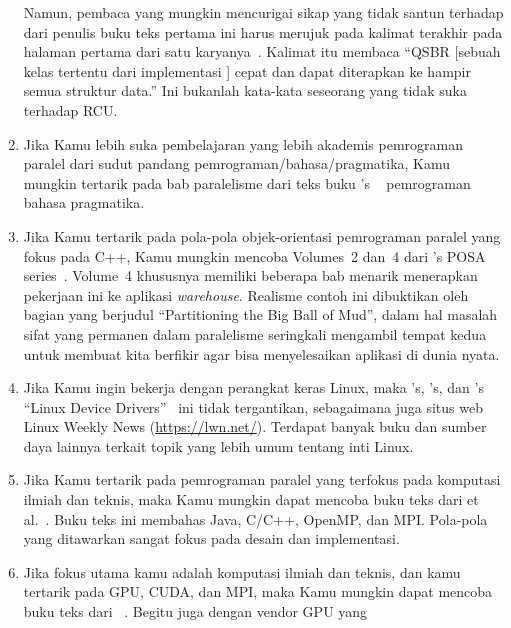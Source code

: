 \begin{enumerate}
	Namun, pembaca yang mungkin mencurigai sikap yang tidak
	santun terhadap  dari penulis buku teks pertama ini
	harus merujuk pada kalimat terakhir pada halaman pertama dari
	satu karyanya~\cite{Balmau:2016:FRM:2935764.2935790}.
	Kalimat itu membaca ``QSBR [sebuah kelas tertentu dari
	implementasi ] cepat dan dapat diterapkan ke hampir
	semua struktur data.''
	Ini bukanlah kata-kata seseorang yang tidak suka
	terhadap RCU.
\item	Jika Kamu lebih suka pembelajaran yang lebih akademis
	pemrograman paralel dari sudut pandang pemrograman\-/bahasa\-/pragmatika,
	Kamu mungkin tertarik pada bab paralelisme dari teks buku
	's ~\cite{MichaelScott2006Textbook,MichaelScott2015Textbook}
	pemrograman bahasa pragmatika.
\item	Jika Kamu tertarik pada pola-pola objek-orientasi
	pemrograman paralel yang fokus pada C++,
	Kamu mungkin mencoba Volumes~2 dan~4 dari 's POSA
	series~\cite{SchmidtStalRohnertBuschmann2000v2Textbook,
	BuschmannHenneySchmidt2007v4Textbook}.
	Volume~4 khususnya memiliki beberapa bab menarik
	menerapkan pekerjaan ini ke aplikasi {\it warehouse}.
	Realisme contoh ini dibuktikan oleh
	bagian yang berjudul ``Partitioning the Big Ball of Mud'',
	dalam hal masalah sifat yang permanen dalam paralelisme seringkali
	mengambil tempat kedua untuk membuat kita berfikir
	agar bisa menyelesaikan aplikasi di dunia nyata.
\item	Jika Kamu ingin bekerja dengan perangkat keras Linux,
	maka 's, 's,
	dan 's
	``Linux Device Drivers''~\cite{CorbetRubiniKroahHartman}
	ini tidak tergantikan, sebagaimana juga situs web Linux Weekly News
	(\url{https://lwn.net/}).
	Terdapat banyak buku dan sumber daya lainnya
	terkait topik yang lebih umum tentang inti Linux.
\item	Jika Kamu tertarik pada pemrograman paralel yang
	terfokus pada komputasi ilmiah dan teknis,
	maka Kamu mungkin dapat mencoba buku teks  dari  et al.~\cite{Mattson2005Textbook}.
	Buku teks ini membahas Java, C/C++, OpenMP, dan MPI\@.
	Pola-pola yang ditawarkan sangat fokus pada desain
	dan implementasi.
\item	Jika fokus utama kamu adalah komputasi ilmiah dan teknis,
	dan kamu tertarik pada GPU, CUDA, dan MPI,
	maka Kamu mungkin dapat mencoba buku teks dari ~\cite{NormMatloff2017ParProcBook}.
	Begitu juga dengan vendor GPU yang

\end{enumerate}
